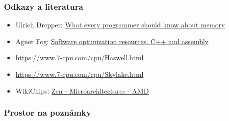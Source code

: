 \documentclass{beamer}
\begin{document}
\begin{frame}
\frametitle{Odkazy a literatura}

\begin{itemize}
\item Ulrich Drepper: \href{https://lwn.net/Articles/250967/}{What every programmer should know about memory}
\item Agner Fog: \href{https://www.agner.org/optimize/}{Software optimization resources. C++ and assembly}
\item \url{https://www.7-cpu.com/cpu/Haswell.html}
\item \url{https://www.7-cpu.com/cpu/Skylake.html}
\item WikiChips: \href{https://en.wikichip.org/wiki/amd/microarchitectures/zen}{Zen - Microarchitectures - AMD}

\end{itemize}

\end{frame}

\begin{frame}
\frametitle{Prostor na poznámky}

\end{frame}
\end{document}
